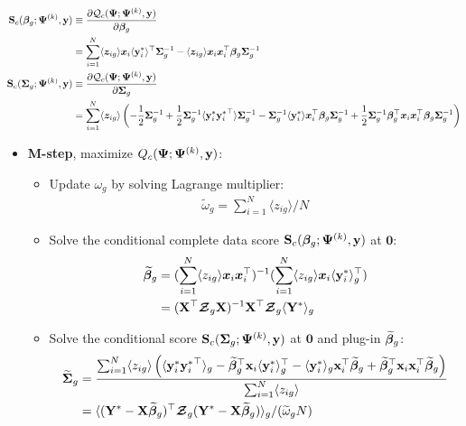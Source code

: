 \documentclass{interact}
\theoremstyle{plain}
\theoremstyle{definition}
\theoremstyle{remark}
\begin{document}
\begin{align*}
    \mathbf{S}_c({\bm \beta}_g;\bm{\Psi}^{(k)},\mathbf{y})&\equiv\frac{\partial\mathcal{Q}_c(\bm{\Psi};\bm{\Psi}^{(k)},\mathbf{y})}{\partial {\bm \beta}_g}\\
    &=\sum_{i=1}^N\langle {\bm{z}_{ig}}\rangle\bm{x}_i\langle{\mathbf{y}_i^*}\rangle^\top\bm{\Sigma}_g^{-1}-\langle {\bm{z}_{ig}}\rangle\bm{x}_i\bm{x}_i^\top{\bm \beta}_g\bm{\Sigma}_g^{-1}\\
    \mathbf{S}_c(\bm{\Sigma}_g;\bm{\Psi}^{(k)},\mathbf{y})&\equiv\frac{\partial\mathcal{Q}_c(\bm{\Psi};\bm{\Psi}^{(k)},\mathbf{y})}{\partial \bm{\Sigma}_g}\\
    &=\sum_{i=1}^N\langle{\bm{z}_{ig}}\rangle\left(-\frac{1}{2}\bm{\Sigma}_g^{-1}+\frac{1}{2}\bm{\Sigma}_g^{-1}\langle\mathbf{y}_i^*{\mathbf{y}_i^*}^\top\rangle\bm{\Sigma}_g^{-1}-\bm{\Sigma}_g^{-1}\langle{\mathbf{y}_i^*}\rangle\bm{x}_i^\top{\bm \beta}_g\bm{\Sigma}_g^{-1}+\frac{1}{2}\bm{\Sigma}_g^{-1}{\bm \beta}_g^\top\bm{x}_i\bm{x}_i^\top{\bm \beta}_g\bm{\Sigma}_g^{-1}\right)
\end{align*}
\begin{itemize}
    \item \textbf{M-step}, maximize $Q_c(\bm{\Psi};\bm{\Psi}^{(k)},\mathbf{y})$:
    \begin{itemize}
        \item Update $\omega_g$ by solving Lagrange multiplier:
        \begin{align}
                \widetilde{\omega}_g=\sum_{i=1}^N \langle z_{ig} \rangle/N
        \end{align}
        
        \item Solve the conditional complete data score $\mathbf{S}_c({\bm \beta}_g;\bm{\Psi}^{(k)},\mathbf{y})$ at $\textbf{0}$:
        \begin{align}\label{eq:beta_hat}
        \begin{split}
                \widetilde{{\bm \beta}}_g&=(\sum_{i=1}^N\langle z_{ig} \rangle\bm{x}_i\bm{x}_i^\top)^{-1}(\sum_{i=1}^N\langle z_{ig} \rangle\bm{x}_i\langle\mathbf{y}_i^* \rangle_g^\top)\\
                &=(\mathbf{X}^\top\boldsymbol{\mathcal{Z}}_g\mathbf{X})^{-1}\mathbf{X}^\top\boldsymbol{\mathcal{Z}}_g\langle \mathbf{Y}^*\rangle_g
        \end{split}
        \end{align}
        \item Solve the conditional score $\mathbf{S}_c(\bm{\Sigma}_g;\bm{\Psi}^{(k)},\mathbf{y})$ at $\textbf{0}$ and plug-in $\widetilde{{\bm \beta}}_g$:
        \begin{align}
        \begin{split}
            \widetilde{\bm{\Sigma}}_g&=\frac{\sum_{i=1}^N\langle z_{ig} \rangle\left(\langle\mathbf{y}_i^*{\mathbf{y}_i^*}^\top\rangle_g-\widetilde{{\bm \beta}}_g^\top\textbf{x}_i\langle{\mathbf{y}_i^*}\rangle_g^\top-\langle\mathbf{y}_i^*\rangle_g\textbf{x}_i^\top\widetilde{{\bm \beta}}_g+\widetilde{{\bm \beta}}_g^\top\textbf{x}_i\textbf{x}_i^\top\widetilde{{\bm \beta}}_g\right)}{\sum_{i=1}^N\langle z_{ig} \rangle}\\
            &=\langle(\mathbf{Y}^*-\textbf{X}\widetilde{{\bm \beta}}_g)^\top\boldsymbol{\mathcal{Z}}_g(\mathbf{Y}^*-\textbf{X}\widetilde{{\bm \beta}}_g) \rangle_g/(\widetilde{\omega}_gN)
        \end{split}
        \end{align}
    \end{itemize}
\end{itemize}
\end{document}
